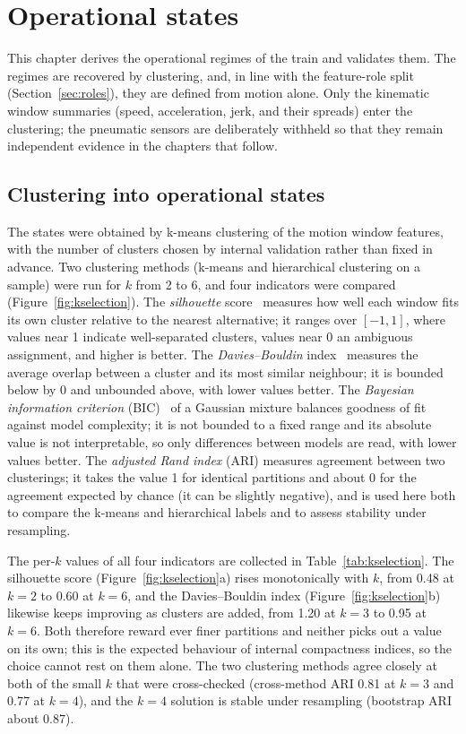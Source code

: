 \chapter{Operational states}
\label{ch:states}

This chapter derives the operational regimes of the train and validates them. The regimes
are recovered by clustering, and, in line with the feature-role split
(Section~\ref{sec:roles}), they are defined from motion alone. Only the kinematic window
summaries (speed, acceleration, jerk, and their spreads) enter the clustering; the pneumatic
sensors are deliberately withheld so that they remain independent evidence in the chapters
that follow.

\section{Clustering into operational states}
\label{sec:kselection}

The states were obtained by k-means clustering of the motion window features, with the
number of clusters chosen by internal validation rather than fixed in advance. Two clustering
methods (k-means and hierarchical clustering on a sample) were run for $k$ from 2 to 6, and
four indicators were compared (Figure~\ref{fig:kselection}). The \emph{silhouette} score~\cite{Rousseeuw:87}
measures how well each window fits its own cluster relative to the nearest alternative; it
ranges over $[-1, 1]$, where values near 1 indicate well-separated clusters, values near 0 an
ambiguous assignment, and higher is better. The \emph{Davies--Bouldin} index~\cite{DaviesBouldin:79}
measures the average overlap between a cluster and its most similar neighbour; it is bounded
below by 0 and unbounded above, with lower values better. The \emph{Bayesian information
criterion} (BIC)~\cite{Schwarz:78} of a Gaussian mixture balances goodness of fit against model
complexity; it is not bounded to a fixed range and its absolute value is not interpretable, so
only differences between models are read, with lower values better. The \emph{adjusted Rand
index} (ARI) measures agreement between two clusterings; it takes the value 1 for identical
partitions and about 0 for the agreement expected by chance (it can be slightly negative), and
is used here both to compare the k-means and hierarchical labels and to assess stability under
resampling.

The per-$k$ values of all four indicators are collected in Table~\ref{tab:kselection}. The
silhouette score (Figure~\ref{fig:kselection}a) rises monotonically with $k$, from 0.48 at
$k=2$ to 0.60 at $k=6$, and the Davies--Bouldin index (Figure~\ref{fig:kselection}b) likewise
keeps improving as clusters are added, from 1.20 at $k=3$ to 0.95 at $k=6$. Both therefore
reward ever finer partitions and neither picks out a value on its own; this is the expected
behaviour of internal compactness indices, so the choice cannot rest on them alone. The two
clustering methods agree closely at both of the small $k$ that were cross-checked (cross-method
ARI 0.81 at $k=3$ and 0.77 at $k=4$), and the $k=4$ solution is stable under resampling
(bootstrap ARI about 0.87).

